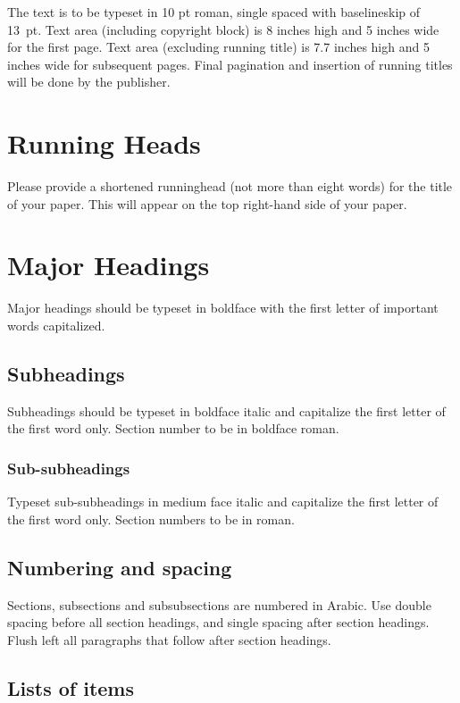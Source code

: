\documentclass{ws-ijmpcs}
\begin{document}
The text is to be typeset in 10 pt roman, single spaced with
baselineskip of 13~pt. Text area (including copyright block)
is 8 inches high and 5 inches wide for the first page.  Text area
(excluding running title) is 7.7 inches high and 5 inches wide for
subsequent pages.  Final pagination and insertion of running titles
will be done by the publisher.

\section{Running Heads}

Please provide a shortened runninghead (not more than eight words) for
the title of your paper. This will appear on the top right-hand side
of your paper.

\section{Major Headings}

Major headings should be typeset in boldface with the first
letter of important words capitalized.

\subsection{Subheadings}

Subheadings should be typeset in boldface italic and capitalize
the first letter of the first word only. Section number to be in
boldface roman.

\subsubsection{Sub-subheadings}

Typeset sub-subheadings in medium face italic and capitalize the
first letter of the first word only. Section numbers to be in
roman.

\subsection{Numbering and spacing}

Sections, subsections and subsubsections are numbered in
Arabic.  Use double spacing before all section headings, and
single spacing after section headings. Flush left all paragraphs
that follow after section headings.

\subsection{Lists of items}
\end{document}
